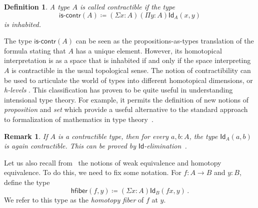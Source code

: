 \documentclass[reqno,10pt,a4paper,oneside]{amsart}
\newcommand{\defeq}{\coloneqq}
\newcommand{\Id}{\mathsf{Id}}
\newcommand{\id}[1]{\Id_{#1}}
\newcommand{\iscontr}{\mathsf{is}\text{-}\mathsf{contr}}
\newcommand{\hfiber}{\mathsf{hfiber}}
\numberwithin{equation}{section}
\theoremstyle{mythm}
\theoremstyle{mydef}
\newtheorem{definition}[theorem]{Definition}
\theoremstyle{myrmk}
\newtheorem{remark}[theorem]{Remark}
\begin{document}
\begin{definition}  A type $A$ is called \emph{contractible} if the  type 
 \begin{equation}
 \label{eq:contractible}
\iscontr(A) \defeq (\Sigma x:A)(\Pi y:A)\id{A}(x,y)
\end{equation}
is inhabited.
\end{definition} 

The type $\iscontr(A)$ can be seen as the propositions-as-types translation
of the formula stating that $A$ has a unique element. However, its homotopical interpretation 
is as a space that is inhabited if and only if the space interpreting $A$ is contractible in the usual
topological sense. The notion of contractibility can be used to articulate the world of types into different homotopical dimensions, or \emph{h-levels} \cite{VoevodskyV:unifc}. This classification has proven to be quite useful in understanding intensional type theory.  
For example, it permits the definition of new notions of \emph{proposition} and \emph{set} which provide a useful alternative to the standard approach to formalization of mathematics in type theory~\cite{VoevodskyV:unifc}.

\begin{remark} \label{thm:idcontrcontr}
If $A$ is a contractible type, then for every $a, b : A$, the type $\id{A}(a,b)$ is again contractible. This can be proved  by $\Id$-elimination~\cite{AwodeyS:indtht}. 
\end{remark}

Let us also recall from~\cite{VoevodskyV:unifc} the notions of weak equivalence and homotopy equivalence. To do this, we need to fix some notation. For $f : A \rightarrow B$
and $y : B$, define the type
\[
 \hfiber(f,y) \defeq (\Sigma x : A) \id{B}(f x, y) \, .
\]
We refer to this type as the \emph{homotopy fiber} of $f$ at $y$. 
\end{document}
